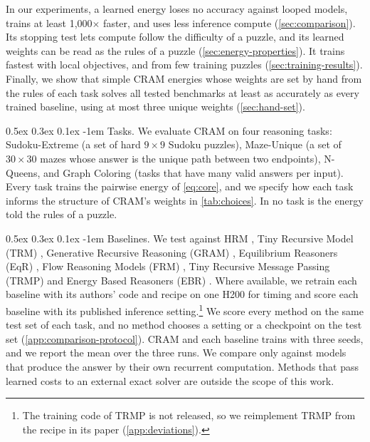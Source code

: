 \documentclass{article}
\makeatletter
\newcommand{\CRAM}{\textsc{CRAM}}
\renewcommand{\paragraph}{%
  \@startsection{paragraph}{4}{\z@}%
                {0.5ex \@plus 0.3ex \@minus 0.1ex}%
                {-1em}%
                {\normalsize\bf}%
}
\makeatother
\begin{document}
In our experiments, a learned energy loses no accuracy against looped models, trains at least 1,000${\times}$ faster, and uses less inference compute (\cref{sec:comparison}).
Its stopping test lets compute follow the difficulty of a puzzle, and its learned weights can be read as the rules of a puzzle (\cref{sec:energy-properties}).
It trains fastest with local objectives, and from few training puzzles (\cref{sec:training-results}).
Finally, we show that simple \CRAM{} energies whose weights are set by hand from the rules of each task solves all tested benchmarks at least as accurately as every trained baseline, using at most three unique weights (\cref{sec:hand-set}).

\paragraph{Tasks.}
\label{sec:task-setup}
We evaluate \CRAM{} on four reasoning tasks:
Sudoku-Extreme \citep{hrm2025} (a set of hard $9\times9$ Sudoku puzzles),
Maze-Unique \citep{eqr2026} (a set of $30\times30$ mazes whose answer is the unique path between two endpoints), N-Queens, and Graph Coloring \citep{gram2026,ebr2026} (tasks that have many valid answers per input).
Every task trains the pairwise energy of \cref{eq:core}, and we specify how each task informs the structure of \CRAM{}'s weights in \cref{tab:choices}.
%
In no task is the energy told the rules of a puzzle.
%

\paragraph{Baselines.}
We test against HRM \citep{hrm2025}, Tiny Recursive Model (TRM) \citep{trm2025}, Generative Recursive Reasoning (GRAM) \citep{gram2026}, Equilibrium Reasoners (EqR) \citep{eqr2026}, Flow Reasoning Models (FRM) \citep{frm2026}, Tiny Recursive Message Passing (TRMP) \citep{trmp2026} and Energy Based Reasoners (EBR) \citep{ebr2026}.
Where available, we retrain each baseline with its authors' code and recipe on one H200 for timing and score each baseline with its published inference setting.\footnote{The training code of TRMP is not released, so we reimplement TRMP from the recipe in its paper (\cref{app:deviations}).}
We score every method on the same test set of each task, and no method chooses a setting or a checkpoint on the test set (\cref{app:comparison-protocol}).
\CRAM{} and each baseline trains with three seeds, and we report the mean over the three runs.
We compare only against models that produce the answer by their own recurrent computation. 
Methods that pass learned costs to an external exact solver \citep{brouard2020,defresne2023,epll2025} are outside the scope of this work.
%
\end{document}
